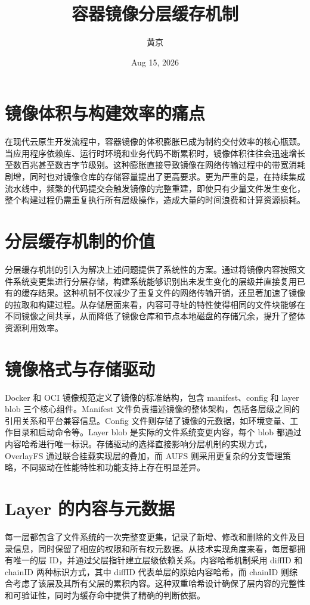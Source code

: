 \title{容器镜像分层缓存机制}
\author{黄京}
\date{Aug 15, 2026}
\maketitle
\chapter{镜像体积与构建效率的痛点}
在现代云原生开发流程中，容器镜像的体积膨胀已成为制约交付效率的核心瓶颈。当应用程序依赖库、运行时环境和业务代码不断累积时，镜像体积往往会迅速增长至数百兆甚至数吉字节级别。这种膨胀直接导致镜像在网络传输过程中的带宽消耗剧增，同时也对镜像仓库的存储容量提出了更高要求。更为严重的是，在持续集成流水线中，频繁的代码提交会触发镜像的完整重建，即使只有少量文件发生变化，整个构建过程仍需重复执行所有层级操作，造成大量的时间浪费和计算资源损耗。\par
\chapter{分层缓存机制的价值}
分层缓存机制的引入为解决上述问题提供了系统性的方案。通过将镜像内容按照文件系统变更集进行分层存储，构建系统能够识别出未发生变化的层级并直接复用已有的缓存结果。这种机制不仅减少了重复文件的网络传输开销，还显著加速了镜像的拉取和构建过程。从存储层面来看，内容可寻址的特性使得相同的文件块能够在不同镜像之间共享，从而降低了镜像仓库和节点本地磁盘的存储冗余，提升了整体资源利用效率。\par
\chapter{镜像格式与存储驱动}
Docker 和 OCI 镜像规范定义了镜像的标准结构，包含 manifest、config 和 layer blob 三个核心组件。Manifest 文件负责描述镜像的整体架构，包括各层级之间的引用关系和平台兼容信息。Config 文件则存储了镜像的元数据，如环境变量、工作目录和启动命令等。Layer blob 是实际的文件系统变更内容，每个 blob 都通过内容哈希进行唯一标识。存储驱动的选择直接影响分层机制的实现方式，OverlayFS 通过联合挂载实现层的叠加，而 AUFS 则采用更复杂的分支管理策略，不同驱动在性能特性和功能支持上存在明显差异。\par
\chapter{Layer 的内容与元数据}
每一层都包含了文件系统的一次完整变更集，记录了新增、修改和删除的文件及目录信息，同时保留了相应的权限和所有权元数据。从技术实现角度来看，每层都拥有唯一的层 ID，并通过父层指针建立层级依赖关系。内容哈希机制采用 diffID 和 chainID 两种标识方式，其中 diffID 代表单层的原始内容哈希，而 chainID 则综合考虑了该层及其所有父层的累积内容。这种双重哈希设计确保了层内容的完整性和可验证性，同时为缓存命中提供了精确的判断依据。\par
